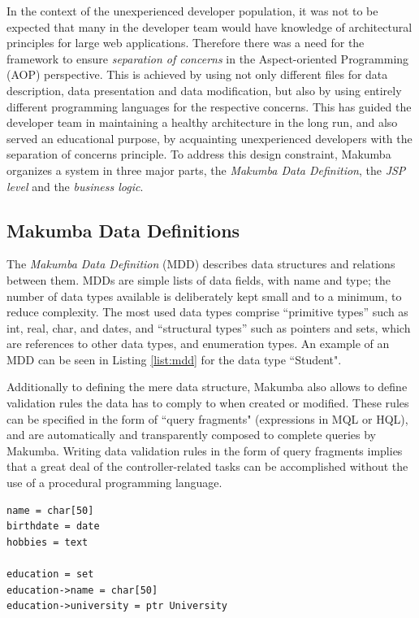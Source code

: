 \documentclass{llncs}
\begin{document}
In the context of the unexperienced developer population, it was not  to be expected that many in the developer team would have knowledge of architectural principles for large web applications. Therefore there was a need for the framework to ensure \textit{separation of concerns}  in the Aspect-oriented Programming (AOP) \cite{Kiczales97aspect-orientedprogramming} perspective. This is achieved by using not only different files for data description, data presentation and data modification, but also by using entirely different programming languages for the respective concerns. This has guided the developer team in maintaining a healthy architecture in the long run, and also served an educational purpose, by acquainting unexperienced developers with the separation of concerns principle. To address this design constraint, Makumba organizes a system in three major parts, the \textit{Makumba Data Definition}, the \textit{JSP level} and the \textit{business logic}. 

\subsection{Makumba Data Definitions}
The \textit{Makumba Data Definition} (MDD) describes data structures and relations between them. MDDs are simple lists of data fields, with name and type; the number of data types available is deliberately kept small and to a minimum, to reduce complexity. The most used data types comprise ``primitive types'' such as int, real, char, and dates, and ``structural types'' such as pointers and sets, which are references to other data types, and enumeration types. An example of an MDD can be seen in Listing \ref{list:mdd} for the data type ``Student".

Additionally to defining the mere data structure, Makumba also allows to define validation rules the data has to comply to when created or modified. These rules can be specified in the form of ``query fragments" (expressions in MQL or HQL), and are automatically and transparently composed to complete queries by Makumba. Writing data validation rules in the form of query fragments implies that a great deal of the controller-related tasks can be accomplished without the use of a procedural programming language.

\lstset{basicstyle=\small, captionpos=b, caption=Makumba Data Definition "Student", label=list:mdd, frame=shadowbox}
\begin{lstlisting}
name = char[50]
birthdate = date
hobbies = text

education = set
education->name = char[50]
education->university = ptr University
\end{lstlisting}
\end{document}
